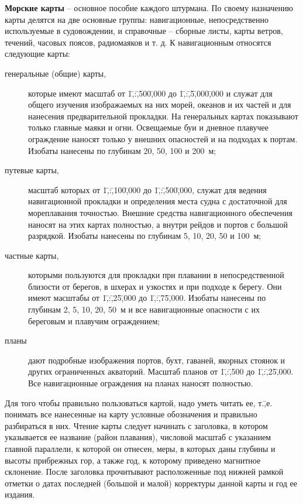\documentclass[a4paper, 12pt, twoside, final, book, russian, fittopage, cyremdash]{ncc}
\begin{document}
\textbf{Морские карты} \--- основное пособие каждого штурмана. По своему назначению карты делятся на две основные группы: навигационные, непосредственно используемые в судовождении, и справочные \--- сборные листы, карты ветров, течений, часовых поясов, радиомаяков и т. д. К навигационным относятся следующие карты: 

\begin{description}
\item [генеральные (общие) карты,] которые имеют масштаб от 1\=,:\=,500\=,000 до 1\=,:\=,5\=,000\=,000 и служат для общего изучения изображаемых на них морей, океанов и их частей и для нанесения предварительной прокладки. На генеральных картах показывают только главные маяки и огни. Освещаемые буи и дневное плавучее ограждение наносят только у внешних опасностей и на подходах к портам. Изобаты нанесены по глубинам 20, 50, 100 и 200~м; 
\item[путевые карты,] масштаб которых от 1\=,:\=,100\=,000 до 1\=,:\=,500\=,000, служат для ведения навигационной прокладки и определения места судна с достаточной для мореплавания точностью. Внешние средства навигационного обеспечения наносят на этих картах полностью, а внутри рейдов и портов с большой разрядкой. Изобаты нанесены по глубинам 5, 10, 20, 50 и 100~м; 
\item[частные карты,] которыми пользуются для прокладки при плавании в непосредственной близости от берегов, в шхерах и узкостях и при подходе к берегу. Они имеют масштабы от 1\=,:\=,25\=,000 до 1\=,:\=,75\=,000. Изобаты нанесены по глубинам 2, 5, 10, 20, 50~м и все навигационные опасности с их береговым и плавучим ограждением; 
\item[планы] дают подробные изображения портов, бухт, гаваней, якорных стоянок и других ограниченных акваторий. Масштаб планов от 1\=,:\=,500 до 1\=,:\=,25\=,000. Все навигационные ограждения на планах наносят полностью. 
\end{description}

Для того чтобы правильно пользоваться картой, надо уметь читать ее, т.\=,е. понимать все нанесенные на карту условные обозначения и правильно разбираться в них. Чтение карты следует начинать с заголовка, в котором указывается ее название (район плавания), числовой масштаб с указанием главной параллели, к которой он отнесен, меры, в которых даны глубины и высоты прибрежных гор, а также год, к которому приведено магнитное склонение. После заголовка прочитывают расположенные под нижней рамкой отметки о датах последней (большой и малой) корректуры данной карты и год ее издания.
 
\end{document}
